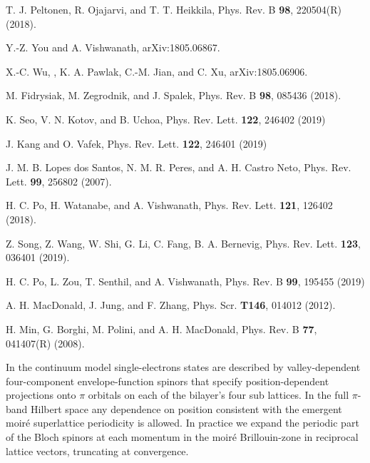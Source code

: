 \documentclass[aps,prl,reprint,amssymb,groupedaddress,twocolumn]{revtex4}
\begin{document}
\begin{thebibliography}{99}
	T. J. Peltonen,  R. Ojajarvi, and T. T. Heikkila,
	Phys. Rev. B \textbf{98}, 220504(R) (2018).
	
	Y.-Z. You and A. Vishwanath,
	arXiv:1805.06867.
	
	X.-C. Wu, , K. A. Pawlak, C.-M. Jian, and C. Xu,
	arXiv:1805.06906.
	
	M. Fidrysiak, M. Zegrodnik, and J. Spalek,
	Phys. Rev. B \textbf{98}, 085436 (2018).
	
	K. Seo, V. N. Kotov, and B. Uchoa,
	Phys. Rev. Lett. \textbf{122}, 246402 (2019)
	
	J. Kang and O. Vafek,
	Phys. Rev. Lett. \textbf{122}, 246401 (2019)
	
	J. M. B. Lopes dos Santos, N. M. R. Peres, and A. H. Castro Neto,
	Phys. Rev. Lett. \textbf{99}, 256802 (2007).
	
	H. C. Po, H. Watanabe, and A. Vishwanath,
	Phys. Rev. Lett. \textbf{121}, 126402 (2018).
	
	Z. Song, Z. Wang, W. Shi, G. Li, C. Fang, B. A. Bernevig, 
	Phys. Rev. Lett. \textbf{123}, 036401 (2019).
	
	H. C. Po, L. Zou, T. Senthil, and A. Vishwanath,
	Phys. Rev. B \textbf{99}, 195455 (2019)
	
	
	A. H. MacDonald, J. Jung, and F. Zhang,
	Phys. Scr. \textbf{T146}, 014012 (2012).
	
	
	H. Min, G. Borghi, M. Polini, and A. H. MacDonald,
	Phys. Rev. B \textbf{77}, 041407(R) (2008).
	
	 In the continuum model single-electrons states are 
	described by valley-dependent four-component envelope-function spinors that specify position-dependent 
	projections onto $\pi$ orbitals on each of the bilayer's four sub lattices.  In the full $\pi$-band 
	Hilbert space any dependence on position consistent with the emergent moir\'e superlattice periodicity 
	is allowed.  In practice we expand the periodic part of the Bloch spinors at each momentum in the 
	moir\'e Brillouin-zone in reciprocal lattice vectors, truncating at convergence.  
	

\end{thebibliography}
\end{document}

